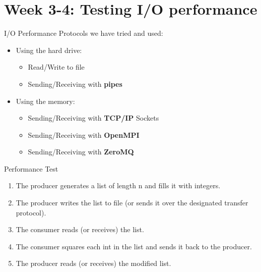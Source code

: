 \documentclass{beamer}
\begin{document}
    \section{Week 3-4: Testing I/O performance}

    \begin{frame}{I/O Performance}
    Protocols we have tried and used:
    \pause
    \begin{itemize}[<+-|alert@+>]
        \item Using the hard drive:
            \begin{itemize}
                \item Read/Write to file
                \item Sending/Receiving with \textbf{pipes}
            \end{itemize}
        \item Using the memory:
            \begin{itemize}[<+-|alert@+>]
                \item Sending/Receiving with \textbf{TCP/IP} Sockets
                \item Sending/Receiving with \textbf{OpenMPI}
                \item Sending/Receiving with \textbf{ZeroMQ}
            \end{itemize}
    \end{itemize}
    \end{frame}
    \begin{frame}{Performance Test}
        \begin{enumerate}[<+-|alert@+>]
            \item The producer generates a list of length n and fills it with
                  integers.
            \item The producer writes the list to file (or sends it over the
                  designated transfer protocol).
            \item The consumer reads (or receives) the list.
            \item The consumer squares each int in the list and sends it back
                  to the producer.
            \item The producer reads (or receives) the modified list.
        \end{enumerate}
    \end{frame}
\end{document}
